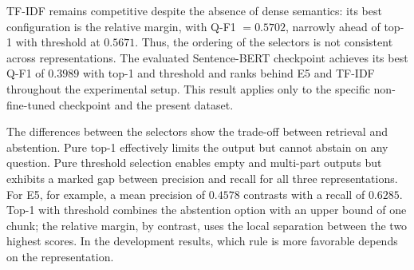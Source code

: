 \documentclass[11pt]{article}
\begin{document}
TF-IDF remains competitive despite the absence of dense semantics: its best configuration is the relative margin, with Q-F1 $=0.5702$, narrowly ahead of top-1 with threshold at $0.5671$. Thus, the ordering of the selectors is not consistent across representations. The evaluated Sentence-BERT checkpoint achieves its best Q-F1 of $0.3989$ with top-1 and threshold and ranks behind E5 and TF-IDF throughout the experimental setup. This result applies only to the specific non-fine-tuned checkpoint and the present dataset.

The differences between the selectors show the trade-off between retrieval and abstention. Pure top-1 effectively limits the output but cannot abstain on any question. Pure threshold selection enables empty and multi-part outputs but exhibits a marked gap between precision and recall for all three representations. For E5, for example, a mean precision of $0.4578$ contrasts with a recall of $0.6285$. Top-1 with threshold combines the abstention option with an upper bound of one chunk; the relative margin, by contrast, uses the local separation between the two highest scores. In the development results, which rule is more favorable depends on the representation.
\end{document}

